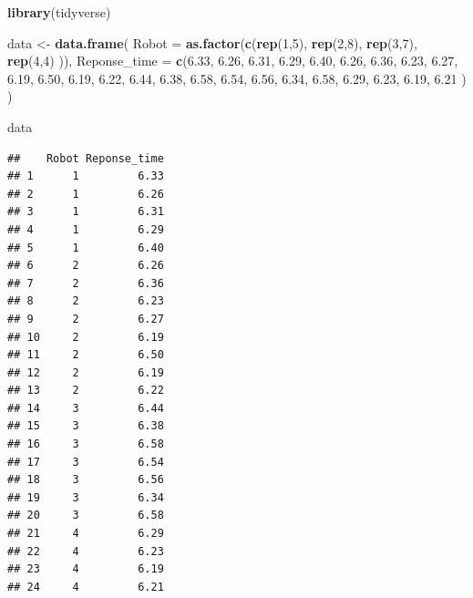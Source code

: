 \documentclass[]{book}
\newenvironment{Shaded}{\begin{snugshade}}{\end{snugshade}}
\newcommand{\DataTypeTok}[1]{\textcolor[rgb]{0.13,0.29,0.53}{#1}}
\newcommand{\DecValTok}[1]{\textcolor[rgb]{0.00,0.00,0.81}{#1}}
\newcommand{\FloatTok}[1]{\textcolor[rgb]{0.00,0.00,0.81}{#1}}
\newcommand{\KeywordTok}[1]{\textcolor[rgb]{0.13,0.29,0.53}{\textbf{#1}}}
\newcommand{\NormalTok}[1]{#1}
\newcommand{\OperatorTok}[1]{\textcolor[rgb]{0.81,0.36,0.00}{\textbf{#1}}}
\newcommand{\StringTok}[1]{\textcolor[rgb]{0.31,0.60,0.02}{#1}}
\begin{document}
\begin{Shaded}
\begin{Highlighting}[]
\KeywordTok{library}\NormalTok{(tidyverse)}

\NormalTok{data <-}\StringTok{ }\KeywordTok{data.frame}\NormalTok{(}
  \DataTypeTok{Robot =} \KeywordTok{as.factor}\NormalTok{(}\KeywordTok{c}\NormalTok{(}\KeywordTok{rep}\NormalTok{(}\DecValTok{1}\NormalTok{,}\DecValTok{5}\NormalTok{), }\KeywordTok{rep}\NormalTok{(}\DecValTok{2}\NormalTok{,}\DecValTok{8}\NormalTok{), }\KeywordTok{rep}\NormalTok{(}\DecValTok{3}\NormalTok{,}\DecValTok{7}\NormalTok{), }\KeywordTok{rep}\NormalTok{(}\DecValTok{4}\NormalTok{,}\DecValTok{4}\NormalTok{) )), }
  \DataTypeTok{Reponse_time =} \KeywordTok{c}\NormalTok{(}\FloatTok{6.33}\NormalTok{, }\FloatTok{6.26}\NormalTok{, }\FloatTok{6.31}\NormalTok{, }\FloatTok{6.29}\NormalTok{, }\FloatTok{6.40}\NormalTok{, }\FloatTok{6.26}\NormalTok{,}
                   \FloatTok{6.36}\NormalTok{, }\FloatTok{6.23}\NormalTok{, }\FloatTok{6.27}\NormalTok{, }\FloatTok{6.19}\NormalTok{, }\FloatTok{6.50}\NormalTok{, }\FloatTok{6.19}\NormalTok{,}
                   \FloatTok{6.22}\NormalTok{, }\FloatTok{6.44}\NormalTok{, }\FloatTok{6.38}\NormalTok{, }\FloatTok{6.58}\NormalTok{, }\FloatTok{6.54}\NormalTok{, }\FloatTok{6.56}\NormalTok{,}
                   \FloatTok{6.34}\NormalTok{, }\FloatTok{6.58}\NormalTok{, }\FloatTok{6.29}\NormalTok{, }\FloatTok{6.23}\NormalTok{, }\FloatTok{6.19}\NormalTok{, }\FloatTok{6.21}\NormalTok{ ) )}

\NormalTok{data}
\end{Highlighting}
\end{Shaded}

\begin{verbatim}
##    Robot Reponse_time
## 1      1         6.33
## 2      1         6.26
## 3      1         6.31
## 4      1         6.29
## 5      1         6.40
## 6      2         6.26
## 7      2         6.36
## 8      2         6.23
## 9      2         6.27
## 10     2         6.19
## 11     2         6.50
## 12     2         6.19
## 13     2         6.22
## 14     3         6.44
## 15     3         6.38
## 16     3         6.58
## 17     3         6.54
## 18     3         6.56
## 19     3         6.34
## 20     3         6.58
## 21     4         6.29
## 22     4         6.23
## 23     4         6.19
## 24     4         6.21
\end{verbatim}

\begin{Shaded}
\end{Shaded}
\end{document}
